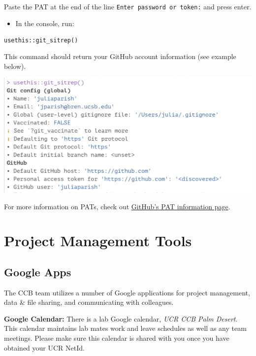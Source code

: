 \documentclass[
]{book}
\providecommand{\tightlist}{%
  \setlength{\itemsep}{0pt}\setlength{\parskip}{0pt}}
\begin{document}
Paste the PAT at the end of the line \texttt{Enter\ password\ or\ token:} and press enter.

\begin{itemize}
\tightlist
\item
  In the console, run:
\end{itemize}

\texttt{usethis::git\_sitrep()}

This command should return your GitHub account information (see example below).

\begin{center}\includegraphics[width=18in]{images/gitsitrep} \end{center}

For more information on PATs, check out \href{https://docs.github.com/en/authentication/keeping-your-account-and-data-secure/creating-a-personal-access-token}{GitHub's PAT information page}.

\hypertarget{projmgmt}{%
\chapter{Project Management Tools}\label{projmgmt}}

\hypertarget{google-apps}{%
\section{Google Apps}\label{google-apps}}

The CCB team utilizes a number of Google applications for project management, data \& file sharing, and communicating with colleagues.

\textbf{Google Calendar:} There is a lab Google calendar, \emph{UCR CCB Palm Desert}. This calendar maintains lab mates work and leave schedules as well as any team meetings. Please make sure this calendar is shared with you once you have obtained your UCR NetId.
\end{document}
